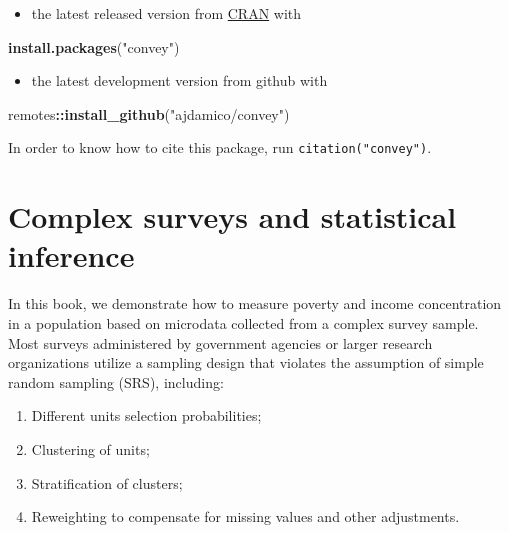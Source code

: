 \documentclass[
]{book}
\newenvironment{Shaded}{\begin{snugshade}}{\end{snugshade}}
\newcommand{\FunctionTok}[1]{\textcolor[rgb]{0.13,0.29,0.53}{\textbf{#1}}}
\newcommand{\NormalTok}[1]{#1}
\newcommand{\SpecialCharTok}[1]{\textcolor[rgb]{0.81,0.36,0.00}{\textbf{#1}}}
\newcommand{\StringTok}[1]{\textcolor[rgb]{0.31,0.60,0.02}{#1}}
\providecommand{\tightlist}{%
  \setlength{\itemsep}{0pt}\setlength{\parskip}{0pt}}
\begin{document}
\begin{itemize}
\tightlist
\item
  the latest released version from \href{https://CRAN.R-project.org/package=convey}{CRAN} with
\end{itemize}

\begin{Shaded}
\begin{Highlighting}[]
\FunctionTok{install.packages}\NormalTok{(}\StringTok{"convey"}\NormalTok{)}
\end{Highlighting}
\end{Shaded}

\begin{itemize}
\tightlist
\item
  the latest development version from github with
\end{itemize}

\begin{Shaded}
\begin{Highlighting}[]
\NormalTok{remotes}\SpecialCharTok{::}\FunctionTok{install\_github}\NormalTok{(}\StringTok{"ajdamico/convey"}\NormalTok{)}
\end{Highlighting}
\end{Shaded}

In order to know how to cite this package, run \texttt{citation("convey")}.

\hypertarget{survey}{%
\section{Complex surveys and statistical inference}\label{survey}}

In this book, we demonstrate how to measure poverty and income concentration in a population based on microdata collected from a complex survey sample. Most surveys administered by government agencies or larger research organizations utilize a sampling design that violates the assumption of simple random sampling (SRS), including:

\begin{enumerate}
\def\labelenumi{\arabic{enumi}.}
\tightlist
\item
  Different units selection probabilities;
\item
  Clustering of units;
\item
  Stratification of clusters;
\item
  Reweighting to compensate for missing values and other adjustments.
\end{enumerate}
\end{document}
